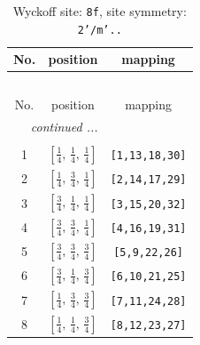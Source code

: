 \documentclass[fleqn,8pt]{jsarticle}
\begin{document}
\begin{longtable}{ccc}
\caption{Wyckoff site: {\tt 8f}, site symmetry: {\tt 2'/m'..}}
 \\
 \hline \hline
No. & position & mapping \\ \hline \endfirsthead

\multicolumn{2}{l}{\tablename\ \thetable{}} \\
 \hline \hline
No. & position & mapping \\ \hline \endhead

 \hline \hline
\multicolumn{2}{r}{\footnotesize\it continued ...} \\ \endfoot

 \hline \hline
\multicolumn{2}{r}{} \\ \endlastfoot

1 & $\left[ \frac{1}{4},\, \frac{1}{4},\, \frac{1}{4} \right]$ & {\tt [1,13,18,30]} \\ \hline
2 & $\left[ \frac{1}{4},\, \frac{3}{4},\, \frac{1}{4} \right]$ & {\tt [2,14,17,29]} \\ \hline
3 & $\left[ \frac{3}{4},\, \frac{1}{4},\, \frac{1}{4} \right]$ & {\tt [3,15,20,32]} \\ \hline
4 & $\left[ \frac{3}{4},\, \frac{3}{4},\, \frac{1}{4} \right]$ & {\tt [4,16,19,31]} \\ \hline
5 & $\left[ \frac{3}{4},\, \frac{3}{4},\, \frac{3}{4} \right]$ & {\tt [5,9,22,26]} \\ \hline
6 & $\left[ \frac{3}{4},\, \frac{1}{4},\, \frac{3}{4} \right]$ & {\tt [6,10,21,25]} \\ \hline
7 & $\left[ \frac{1}{4},\, \frac{3}{4},\, \frac{3}{4} \right]$ & {\tt [7,11,24,28]} \\ \hline
8 & $\left[ \frac{1}{4},\, \frac{1}{4},\, \frac{3}{4} \right]$ & {\tt [8,12,23,27]} \\
\end{longtable}
\renewcommand{\arraystretch}{1.2}
\end{document}
